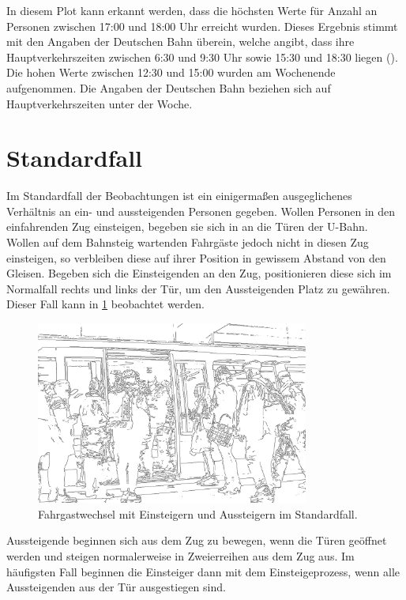 In diesem Plot kann erkannt werden, dass die höchsten Werte für Anzahl an Personen zwischen 17:00 und 18:00 Uhr erreicht wurden. Dieses Ergebnis stimmt mit den Angaben der Deutschen Bahn überein, welche angibt, dass ihre Hauptverkehrszeiten zwischen 6:30 und 9:30 Uhr sowie 15:30 und 18:30 liegen (\cite{DeutscheBahnAG.2018}). Die hohen Werte zwischen 12:30 und 15:00 wurden am Wochenende aufgenommen. Die Angaben der Deutschen Bahn beziehen sich auf Hauptverkehrszeiten unter der Woche.
\section{Standardfall}
Im Standardfall der Beobachtungen ist ein einigermaßen ausgeglichenes Verhältnis an ein- und aussteigenden Personen gegeben. Wollen Personen in den einfahrenden Zug einsteigen, begeben sie sich in an die Türen der U-Bahn. Wollen auf dem Bahnsteig wartenden Fahrgäste jedoch nicht in diesen Zug einsteigen, so verbleiben diese auf ihrer Position in gewissem Abstand von den Gleisen. Begeben sich die Einsteigenden an den Zug, positionieren diese sich im Normalfall rechts und links der Tür, um den Aussteigenden Platz zu gewähren. Dieser Fall kann in \figurename \ref{fig:normalerFahrgastwechsel} beobachtet werden.
\begin{figure}[H] 
	\centering
		\includegraphics[width=0.8\textwidth]{pictures/observation/standard/exchange.png} 
	\caption{Fahrgastwechsel mit Einsteigern und Aussteigern im Standardfall.}
	\label{fig:normalerFahrgastwechsel}
\end{figure} 
Aussteigende beginnen sich aus dem Zug zu bewegen, wenn die Türen geöffnet werden und steigen normalerweise in Zweierreihen aus dem Zug aus. Im häufigsten Fall beginnen die Einsteiger dann mit dem Einsteigeprozess, wenn alle Aussteigenden aus der Tür ausgestiegen sind.
